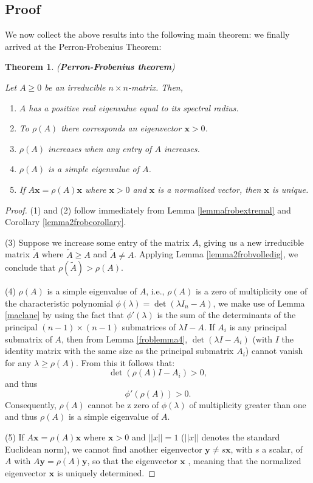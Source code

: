 \documentclass[a4paper,11pt]{report}
\newtheorem{theorem}{Theorem}[section]
\begin{document}
\subsection{Proof}
We now collect the above results into the following main theorem: we finally 
arrived at the Perron-Frobenius Theorem:
\begin{theorem}(\textbf{Perron-Frobenius theorem})\label{frobtheorem}

  Let $A \geq 0$ be an irreducible $n\times n$-matrix. Then,
  \begin{enumerate}
    \item $A$ has a positive real eigenvalue equal to its spectral radius.
    \item To $\rho(A)$ there corresponds an eigenvector $\mathbf{x} > 0$.
    \item $\rho(A)$ increases when any entry of $A$ increases.
    \item $\rho(A)$ is a simple eigenvalue of $A$.
    \item If $A\mathbf{x} = \rho(A)\mathbf{x}$ where $\mathbf{x} > 0$ and $\mathbf{x}$ 
    is a normalized vector, then $\mathbf{x}$ is unique.
    
  \end{enumerate}
  \end{theorem}
 \begin{proof}
  (1) and (2) follow immediately from Lemma \ref{lemmafrobextremal} and 
   Corollary \ref{lemma2frobcorollary}. 
   
  (3) Suppose we increase 
   some entry of the matrix $A$, giving us a new irreducible matrix $\tilde{A}$ 
   where $\tilde{A} \geq A$ and  $\tilde{A} \not = A$. Applying Lemma 
   \ref{lemma2frobvolledig}, we conclude that $\rho(\tilde{A}) > \rho(A).$ 
   
   (4) $\rho(A)$ is a simple eigenvalue of $A$, i.e., $\rho(A)$ is a zero of multiplicity one of the characteristic polynomial
   $\phi(\lambda) = \det(\lambda I_n - A)$, we make use of Lemma \ref{maclane} by using the fact that $\phi'(\lambda)$ is the sum of the
   determinants of the principal $(n-1)\times(n-1)$ submatrices of $\lambda I - A$. If $A_i$ is any principal submatrix of
   $A$, then from Lemma \ref{froblemma4}, $\det(\lambda I - A_i)$ (with $I$ the identity matrix with the same size as the principal submatrix $A_i$) cannot vanish 
   for any $\lambda \geq \rho(A)$. From this it follows that:
   $$\det(\rho(A)I - A_i) > 0,$$
   and thus
   $$\phi'(\rho(A)) > 0.$$
   Consequently, $\rho(A)$ cannot be z zero of $\phi(\lambda)$ of multiplicity 
   greater than one and thus $\rho(A)$ is a simple eigenvalue of $A$. 
   
  (5) If $A\mathbf{x} = \rho(A)\mathbf{x}$ where $\mathbf{x} > 0$ 
   and $||x|| = 1$ ($||x||$ denotes the standard Euclidean norm), we cannot find 
   another eigenvector $\mathbf{y} \not = s\mathbf{x}$, with $s$ a scalar, of $A$ 
   with $A\mathbf{y} = \rho(A)\mathbf{y}$, so that the eigenvector $\mathbf{x}$ 
   , meaning that the normalized eigenvector $\mathbf{x}$ is uniquely 
   determined.
       \end{proof}
\end{document}
